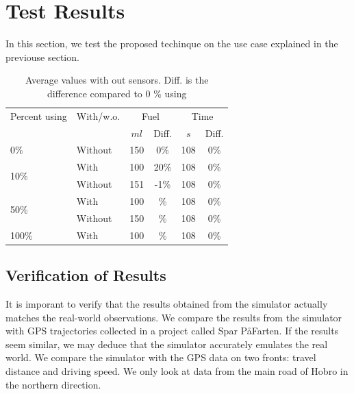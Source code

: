 \section{Test Results}\label{sec:Test}
In this section, we test the proposed techinque on the use case explained in the previouse section.



\begin{table}
\centering
\begin{tabular}{|l|l|cc|cc|}\hline
Percent using 			& With/w.o. 	& \multicolumn{2}{c|}{Fuel} 	& \multicolumn{2}{c|}{Time}\\
\tech					&\tech					& $ml$	& Diff.		&	$s$	& Diff.\\\hline
\multirow{1}{*}{0\%}	& Without	&	150 &	0\%	&	108 & 0\%		\\\hline
\multirow{2}{*}{10\%}	& With 	&	100 &	20\%	&	108 & 0\%		\\
						& Without 	&	151 &	-1\%	&	108 & 0\%		\\\hline
\multirow{2}{*}{50\%}	& With	&	100	&	\%		&	108 & 0\%\\
						& Without	&	150	&	\%		&	108 & 0\%\\\hline
\multirow{1}{*}{100\%}	& With	&	100	&	\%		&	108 & 0\%\\\hline
\end{tabular}
\caption{Average values with out sensors. Diff. is the difference compared to 0 \% using \tech}
\label{tb:TestResults:total}
\end{table}

\subsection{Verification of Results}
It is imporant to verify that the results obtained from the simulator actually matches the real-world observations.
We compare the results from the simulator with GPS trajectories collected in a project called Spar P\aa Farten\cite{}.
If the results seem similar, we may deduce that the simulator accurately emulates the real world.
We compare the simulator with the GPS data on two fronts: travel distance and driving speed.
We only look at data from the main road of Hobro in the northern direction.

